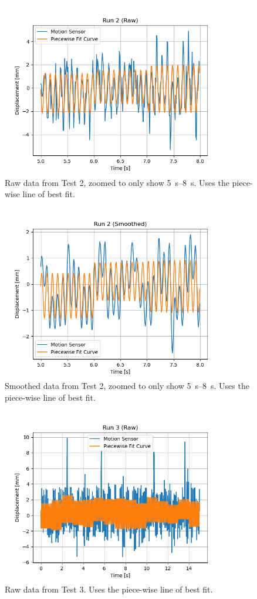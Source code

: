 \documentclass[12 pt]{report}
\begin{document}
\begin{figure}[htbp]
\centering
\includegraphics[width=4in]{images/Graphs/Run_2-Raw-PW-Zoomed}
\caption{Raw data from Test \num{2}, zoomed to only show \qtyrange{5}{8}{\s}. Uses the piece-wise line of best fit.}
\end{figure}

\begin{figure}[htbp]
\centering
\includegraphics[width=4in]{images/Graphs/Run_2-Smoothed-PW-Zoomed}
\caption{Smoothed data from Test \num{2}, zoomed to only show \qtyrange{5}{8}{\s}. Uses the piece-wise line of best fit.}
\end{figure}


\begin{figure}[htbp]
\centering
\includegraphics[width=4in]{images/Graphs/Run_3-Raw-PW}
\caption{Raw data from Test \num{3}. Uses the piece-wise line of best fit.}
\end{figure}
\end{document}
